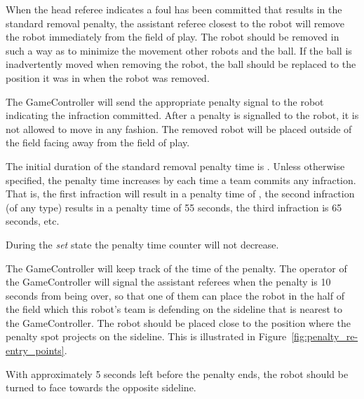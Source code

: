 When the head referee indicates a foul has been committed that results in the standard removal penalty, the assistant referee closest to the robot will remove the robot immediately from the field of play. The robot should be removed in such a way as to minimize the movement other robots and the ball. If the ball is inadvertently moved when removing the robot, the ball should be replaced to the position it was in when the robot was removed.

The GameController will send the appropriate penalty signal to the robot indicating the infraction committed. After a penalty is signalled to the robot, it is not allowed to move in any fashion. The removed robot will be placed outside of the field facing away from the field of play.

The initial duration of the standard removal penalty time is \StandardPenaltyTime.
Unless otherwise specified, the penalty time increases by \StandardPenaltyIncrease each time a team commits any infraction.
That is, the first infraction will result in a penalty time of \StandardPenaltyTime, the second infraction (of any type) results in a penalty time of 55 seconds, the third infraction is 65 seconds, etc.

During the \emph{set} state the penalty time counter will not decrease.

The GameController will keep track of the time of the penalty. The operator of the GameController will signal the assistant referees when the penalty is 10 seconds from being over, so that one of them can place the robot in the half of the field which this robot's team is defending on the sideline that is nearest to the GameController. The robot should be placed close to the position where the penalty spot projects on the sideline. This is illustrated in Figure~\ref{fig:penalty_re-entry_points}.

With approximately 5 seconds left before the penalty ends, the robot should be turned to face towards the opposite sideline.

